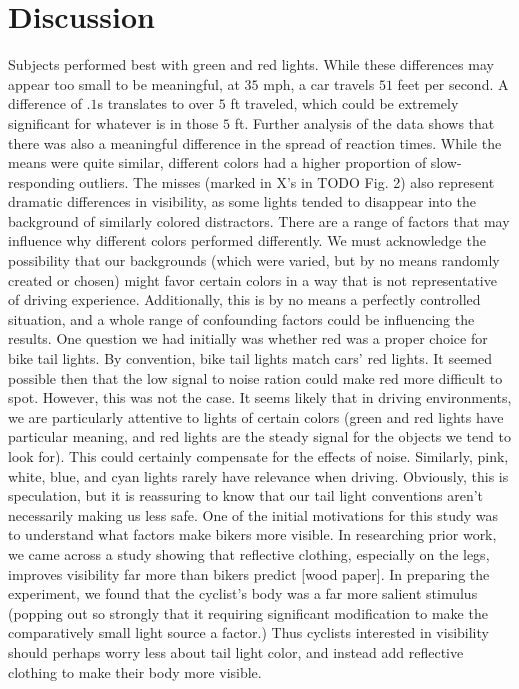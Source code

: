 \section{Discussion}

Subjects performed best with green and red lights. While these differences
may appear too small to be meaningful, at $35$ mph, a car travels $51$ feet per
second. A difference of $.1$s translates to over $5$ ft traveled, which could
be extremely significant for whatever is in those $5$ ft.  Further analysis
of the data shows that there was also a meaningful difference in the spread
of reaction times. While the means were quite similar, different colors had
a higher proportion of slow-responding outliers. The misses (marked in X's
in TODO Fig. 2) also represent dramatic differences in visibility, as some
lights tended to disappear into the background of similarly colored
distractors.  There are a range of factors that may influence why different
colors performed differently. We must acknowledge the possibility that our
backgrounds (which were varied, but by no means randomly created or chosen)
might favor certain colors in a way that is not representative of driving
experience. Additionally, this is by no means a perfectly controlled
situation, and a whole range of confounding factors could be influencing
the results.  One question we had initially was whether red was a proper
choice for bike tail lights. By convention, bike tail lights match cars'
red lights. It seemed possible then that the low signal to noise ration
could make red more difficult to spot. However, this was not the case. It
seems likely that in driving environments, we are particularly attentive to
lights of certain colors (green and red lights have particular meaning, and
red lights are the steady signal for the objects we tend to look for). This
could certainly compensate for the effects of noise. Similarly, pink,
white, blue, and cyan lights rarely have relevance when driving. Obviously,
this is speculation, but it is reassuring to know that our tail light
conventions aren't necessarily making us less safe.  One of the initial
motivations for this study was to understand what factors make bikers more
visible. In researching prior work, we came across a study showing that
reflective clothing, especially on the legs, improves visibility far more
than bikers predict [wood paper]. In preparing the experiment, we found
that the cyclist's body was a far more salient stimulus (popping out so
strongly that it requiring significant modification to make the
comparatively small light source a factor.) Thus cyclists interested in
visibility should perhaps worry less about tail light color, and instead
add reflective clothing to make their body more visible.

